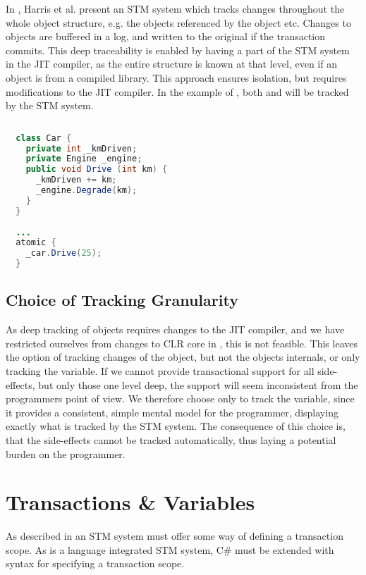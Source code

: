 In \cite{harris2003language}, Harris et al. present an \ac{STM} system which tracks changes throughout the whole object structure, e.g. the objects referenced by the object etc. Changes to objects are buffered in a log, and written to the original if the transaction commits. This deep  traceability is enabled by having a part of the \ac{STM} system in the \ac{JIT} compiler, as the entire structure is known at that level, even if an object is from a compiled library. This approach ensures isolation, but requires modifications to the \ac{JIT} compiler. In the example of , both  and  will be tracked by the \ac{STM} system.
%
\begin{lstlisting}[label=lst:tracking_object,
  float,
  caption={Tracking Changes to Object},
  language=Java,  
  showspaces=false,
  showtabs=false,
  breaklines=true,
  showstringspaces=false,
  breakatwhitespace=true,
  commentstyle=\color{greencomments},
  keywordstyle=\color{bluekeywords},
  stringstyle=\color{redstrings},
  morekeywords={atomic, retry, orElse, var, get, set}]  % Start your code-block
  
  class Car {
    private int _kmDriven;
    private Engine _engine;
    public void Drive (int km) { 
      _kmDriven += km; 
      _engine.Degrade(km);
    }
  }
  
  ...
  atomic {
    _car.Drive(25);
  }
\end{lstlisting}
%
\subsection{Choice of Tracking Granularity}
As deep tracking of objects requires changes to the \ac{JIT} compiler, and we have restricted ourselves from changes to \ac{CLR} core in , this is not feasible. This leaves the option of tracking changes of the object, but not the objects internals, or only tracking the variable. If we cannot provide transactional support for all side-effects, but only those one level deep, the support will seem inconsistent from the programmers point of view. We therefore choose only to track the variable, since it provides a consistent, simple mental model for the programmer, displaying exactly what is tracked by the \ac{STM} system. The consequence of this choice is, that the side-effects cannot be tracked automatically, thus laying a potential burden on the programmer. 

\section{Transactions \& Variables}
\label{subsec:rec_transactions_variables}
As described in  an \ac{STM} system must offer some way of defining a transaction scope. As \stmnamesp is a language integrated \ac{STM} system, C\# must be extended with syntax for specifying a transaction scope.

